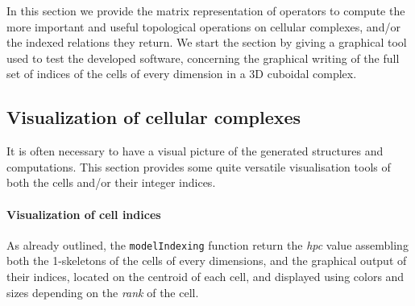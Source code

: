 \documentclass[11pt,oneside]{article}	%
\begin{document}
In this section we provide the matrix representation of operators to compute the more important and useful topological operations on cellular complexes, and/or the indexed relations they return. We start the section by giving a graphical tool used to test the developed software, concerning the graphical writing of the full set of indices of the cells of every dimension in a 3D cuboidal complex.  

\subsection{Visualization of cellular complexes}

It is often necessary to have a visual picture of the generated structures and computations.
This section provides some quite versatile visualisation tools of both the cells and/or their integer indices.

\paragraph{Visualization of cell indices}
As already outlined, the \texttt{modelIndexing} function return the \emph{hpc} value assembling both the 1-skeletons of the cells of every dimensions, and the graphical output of their indices, located on the centroid of each cell, and displayed using colors and sizes depending on the \emph{rank} of the cell.
\end{document}
